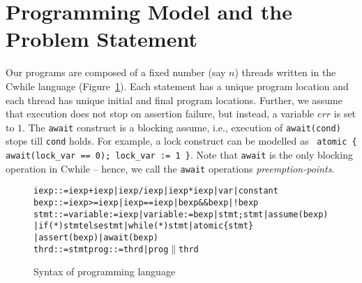 \documentclass{llncs}
\newcommand\errVar{\ensuremath{\mathit{err}}}
\begin{document}
\section{Programming Model and the Problem Statement}
\label{sec:defs}



Our programs are composed of a fixed number (say $n$) threads
written in the {\sc Cwhile} language (Figure~\ref{fig:syntax}).
Each statement has a unique program location and each thread has unique
initial and final program locations.
Further, we assume that execution does not stop on assertion
failure, but instead, a variable $\errVar$ is set to $1$.
The {\tt await} construct is a blocking assume, i.e., execution of
{\tt await(cond)} stops till {\tt cond} holds.
For example, a lock construct can be modelled as {\tt
atomic \{  await(lock\_var == 0); lock\_var := 1 \}}.
Note that {\tt await} is the only blocking operation in {\sc Cwhile} --
hence, we call the {\tt await} operations {\em preemption-points}.
\begin{figure} 
  \vspace{1ex}
\begin{alltt}
iexp ::= iexp + iexp | iexp / iexp | iexp * iexp | var | constant
bexp ::= iexp >= iexp | iexp == iexp | bexp && bexp | !bexp
stmt ::= variable := iexp | variable := bexp | stmt; stmt | assume(bexp) 
         | if (*) stmt else stmt | while (*) stmt | atomic \{ stmt \}
         | assert(bexp) | await(bexp)
thrd ::= stmt                               prog  ::= thrd | prog\(\parallel\)thrd
\end{alltt}
\vspace{-4ex}
\caption{Syntax of programming language}
\label{fig:syntax}
\end{figure}

\!\!\!\!\!\!\!\!
\end{document}
